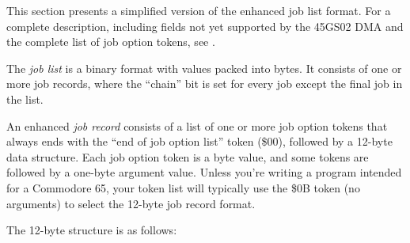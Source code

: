 This section presents a simplified version of the enhanced job list format. For a complete description, including fields not yet supported by the 45GS02 DMA and the complete list of job option tokens, see .

The {\em job list} is a binary format with values packed into bytes. It consists of one or more job records, where the ``chain'' bit is set for every job except the final job in the list.

An enhanced {\em job record} consists of a list of one or more job option tokens that always ends with the ``end of job option list'' token (\$00), followed by a 12-byte data structure. Each job option token is a byte value, and some tokens are followed by a one-byte argument value. Unless you're writing a program intended for a Commodore 65, your token list will typically use the \$0B token (no arguments) to select the 12-byte job record format.

The 12-byte structure is as follows:

